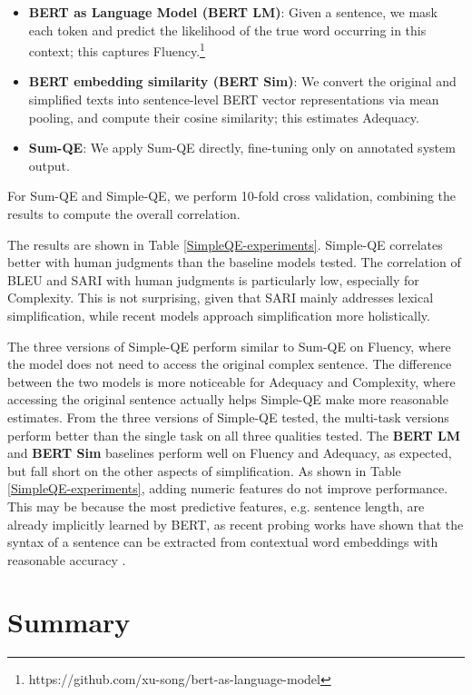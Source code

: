 \documentclass[thesis.tex]{subfiles}
\begin{document}
\begin{itemize}
    \item \textbf{BERT as Language Model (BERT LM)}: Given a sentence, we mask each token and predict the likelihood of the true word occurring in this context; this captures Fluency.\footnote{https://github.com/xu-song/bert-as-language-model}
    \item \textbf{BERT embedding similarity (BERT Sim)}: We convert the original and simplified texts into sentence-level BERT vector representations via mean pooling, and compute their cosine similarity; this estimates Adequacy.
    \item \textbf{Sum-QE}: We apply Sum-QE directly, fine-tuning only on annotated system output.
\end{itemize}

For Sum-QE and Simple-QE, we perform 10-fold cross validation, combining the results to compute the overall correlation.

The results are shown in Table \ref{SimpleQE-experiments}. Simple-QE correlates better with human judgments than the baseline models tested. The correlation of BLEU and SARI with human judgments is particularly low, especially for Complexity. This is not surprising, given that SARI mainly addresses lexical simplification, while recent models approach simplification more holistically. 

The three versions of Simple-QE perform similar to Sum-QE on Fluency, where the model does not need to access the original complex sentence. The difference between the two models is more noticeable for Adequacy and Complexity, where accessing the original sentence actually helps Simple-QE make more reasonable 
estimates. From the three versions of Simple-QE tested, the multi-task versions perform better than the single task on all three qualities tested. The \textbf{BERT LM} and \textbf{BERT Sim} baselines perform well on Fluency and Adequacy, as expected, but fall short on the other aspects of simplification. As shown in Table \ref{SimpleQE-experiments}, adding numeric features do not improve performance. This may be because the most predictive features, e.g. sentence length, are already implicitly learned by BERT, as recent probing works have shown that the syntax of a sentence can be extracted from contextual word embeddings with reasonable accuracy \citep{hewitt2019structural}.

\section{Summary}



\biblio
\end{document}
